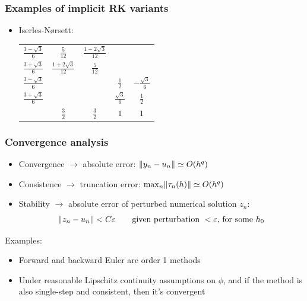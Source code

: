 \documentclass{beamer}
\begin{document}
\begin{frame} %
	\frametitle{Examples of implicit RK variants}
	\begin{itemize}
		\item Iserles-Nørsett:
		\begin{tabular}{c|cccc}
			$\frac{3-\sqrt{3}}{6}$ & $\frac{5}{12}$ & $\frac{1-2\sqrt{3}}{12}$ & & \\
			$\frac{3+\sqrt{3}}{6}$ & $\frac{1+2\sqrt{3}}{12}$ & $\frac{5}{12}$ & & \\
			$\frac{3-\sqrt{3}}{6}$ & & & $\frac{1}{2}$ & $-\frac{\sqrt{3}}{6}$ \\
			$\frac{3+\sqrt{3}}{6}$ & & & $\frac{\sqrt{3}}{6}$ & $\frac{1}{2}$ \\
			\hline
			& $\frac{3}{2}$ & $\frac{3}{2}$ & $1$ & $1$
			\end{tabular}
	\end{itemize}
\end{frame}


\begin{frame} %
	\frametitle{Convergence analysis}
	\begin{itemize}
		\item Convergence $\to$ absolute error: $\lVert y_n - u_n\rVert \simeq O(h^q)$
		\item Consistence $\to$ truncation error: $\max_n \lVert\tau_n(h)\rVert \simeq O(h^q)$
		\item Stability $\to$ absolute error of perturbed numerical solution $z_n$:
		$$ 	\lVert z_n-u_n\rVert < C \varepsilon \qquad
		\text{given perturbation } < \varepsilon \text{, for some } h_0 $$
	\end{itemize}
	\pause
	Examples:
	\begin{itemize}
		\item Forward and backward Euler are order 1 methods
		\item Under reasonable Lipschitz continuity assumptions on $\phi$, and if the method is also single-step and consistent, then it's convergent
	\end{itemize}
\end{frame}
\end{document}
